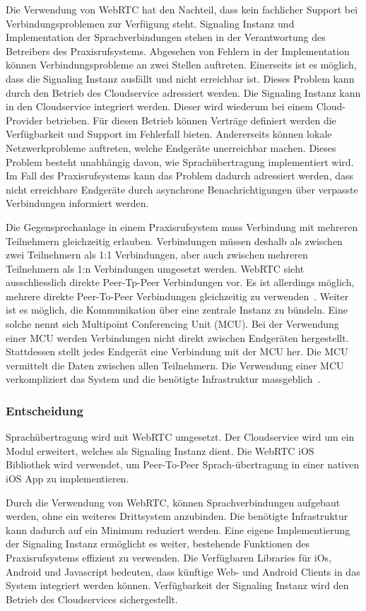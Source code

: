 Die Verwendung von WebRTC hat den Nachteil, dass kein fachlicher Support bei Verbindungsproblemen zur Verfügung steht.
Signaling Instanz und Implementation der Sprachverbindungen stehen in der Verantwortung des Betreibers des Praxisrufsystems.
Abgesehen von Fehlern in der Implementation können Verbindungsprobleme an zwei Stellen auftreten.
Einerseits ist es möglich, dass die Signaling Instanz ausfällt und nicht erreichbar ist.
Dieses Problem kann durch den Betrieb des Cloudservice adressiert werden.
Die Signaling Instanz kann in den Cloudservice integriert werden.
Dieser wird wiederum bei einem Cloud-Provider betrieben.
Für diesen Betrieb können Verträge definiert werden die Verfügbarkeit und Support im Fehlerfall bieten.
Andererseits können lokale Netzwerkprobleme auftreten, welche Endgeräte unerreichbar machen.
Dieses Problem besteht unabhängig davon, wie Sprachübertragung implementiert wird.
Im Fall des Praxisrufsystems kann das Problem dadurch adressiert werden, dass nicht erreichbare Endgeräte durch asynchrone Benachrichtigungen über verpasste Verbindungen informiert werden.

Die Gegensprechanlage in einem Praxisrufsystem muss Verbindung mit mehreren Teilnehmern gleichzeitig erlauben.
Verbindungen müssen deshalb als zwischen zwei Teilnehmern als 1:1 Verbindungen, aber auch zwischen mehreren Teilnehmern als 1:n Verbindungen umgesetzt werden.
WebRTC sieht ausschliesslich direkte Peer-Tp-Peer Verbindungen vor.
Es ist allerdings möglich, mehrere direkte Peer-To-Peer Verbindungen gleichzeitig zu verwenden~\cite{webrtc_mesh}.
Weiter ist es möglich, die Kommunikation über eine zentrale Instanz zu bündeln.
Eine solche nennt sich Multipoint Conferencing Unit (MCU).
Bei der Verwendung einer MCU werden Verbindungen nicht direkt zwischen Endgeräten hergestellt.
Stattdessen stellt jedes Endgerät eine Verbindung mit der MCU her.
Die MCU vermittelt die Daten zwischen allen Teilnehmern.
Die Verwendung einer MCU verkompliziert das System und die benötigte Infrastruktur massgeblich~\cite{webrtc_mcu}.

\subsubsection{Entscheidung}

Sprachübertragung wird mit WebRTC umgesetzt.
Der Cloudservice wird um ein Modul erweitert, welches als Signaling Instanz dient.
Die WebRTC iOS Bibliothek wird verwendet, um Peer-To-Peer Sprach-übertragung in einer nativen iOS App zu implementieren.

Durch die Verwendung von WebRTC, können Sprachverbindungen aufgebaut werden, ohne ein weiteres Drittsystem anzubinden.
Die benötigte Infrastruktur kann dadurch auf ein Minimum reduziert werden.
Eine eigene Implementierung der Signaling Instanz ermöglicht es weiter, bestehende Funktionen des Praxisrufsystems effizient zu verwenden.
Die Verfügbaren Libraries für iOs, Android und Javascript bedeuten, dass künftige Web- und Android Clients in das System integriert werden können.
Verfügbarkeit der Signaling Instanz wird den Betrieb des Cloudservices sichergestellt.

\clearpage
